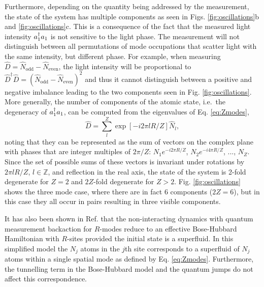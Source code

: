 Furthermore, depending on the quantity being addressed by the
measurement, the state of the system has multiple components as seen
in Figs. \ref{fig:oscillations}b and \ref{fig:oscillations}c. This is a
consequence of the fact that the measured light intensity $a^\dagger_1 a_1$
is not sensitive to the light phase. The measurement will not
distinguish between all permutations of mode occupations that scatter
light with the same intensity, but different phase. For example, when
measuring $\hat{D} = \hat{N}_\mathrm{odd} - \hat{N}_\mathrm{even}$,
the light intensity will be proportional to
$\hat{D}^\dagger \hat{D} = (\hat{N}_\mathrm{odd} -
\hat{N}_\mathrm{even})^2$ and thus it cannot distinguish between a
positive and negative imbalance leading to the two components seen in
Fig. \ref{fig:oscillations}. More generally, the number of components
of the atomic state, i.e.~the degeneracy of $a^\dagger_1 a_1$, can be
computed from the eigenvalues of Eq. \eqref{eq:Zmodes}, 
\begin{equation}
  \hat{D} = \sum_l^Z \exp\left[-i 2 \pi l R / Z \right] \hat{N}_l,
\end{equation}
noting that they can be represented as the sum of vectors on the
complex plane with phases that are integer multiples of $2 \pi / Z$:
$N_1 e^{-i 2 \pi R / Z}$, $N_2 e^{-i 4 \pi R / Z}$, ..., $N_Z$. Since
the set of possible sums of these vectors is invariant under rotations
by $2 \pi l R / Z$, $l \in \mathbb{Z}$, and reflection in the real axis, the
state of the system is 2-fold degenerate for $Z = 2$ and $2Z$-fold
degenerate for $Z > 2$. Fig. \ref{fig:oscillations} shows the three
mode case, where there are in fact $6$ components ($2Z = 6$), but in
this case they all occur in pairs resulting in three visible
components.

It has also been shown in Ref. \cite{mazzucchi2016njp} that the
non-interacting dynamics with quantum measurement backaction for
$R$-modes reduce to an effective Bose-Hubbard Hamiltonian with
$R$-sites provided the initial state is a superfluid. In this
simplified model the $N_j$ atoms in the $j$th site corresponds to a
superfluid of $N_j$ atoms within a single spatial mode as defined by
Eq. \eqref{eq:Zmodes}. Furthermore, the tunnelling term in the
Bose-Hubbard model and the quantum jumps do not affect this
correspondence.

